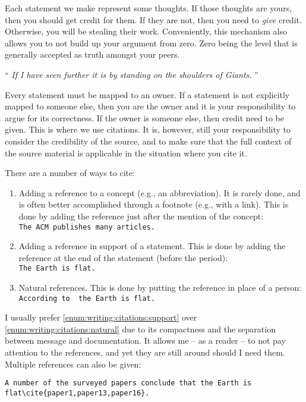 \documentclass[a4paper, oneside]{memoir}
\newenvironment{inspiration}[1]
{
    \begin{center}
    \newcommand{\saveme}{#1}
    \begin{minipage}{0.9\textwidth}
}
{
    
    \raggedleft{--- \textsl{\saveme}}
    \end{minipage}
    \end{center}
}
\newcommand{\idx}[1]{\index{#1}\marginpar{\raggedright \tiny #1}}
\begin{document}
Each statement we make represent some thoughts. If those thoughts are yours, then you should get credit\idx{Credit} for them. If they are not, then you need to \textsl{give} credit. Otherwise, you will be stealing their work. Conveniently, this mechanism also allows you to not build up your argument from zero. Zero being the level that is generally accepted as truth amongst your peers.

\begin{inspiration}{Isaac Newton\cite{Solr-dc-9792}}
  ``
    \textsl{If I have seen further it is by standing on the shoulders of Giants.}
  ''
\end{inspiration}

Every statement must be mapped to an owner. If a statement is not explicitly mapped to someone else, then you are the owner and it is your responsibility to argue for its correctness. If the owner is someone else, then credit need to be given. This is where we use citations. It is, however, still your responsibility to consider the credibility of the source, and to make sure that the full context of the source material is applicable in the situation where you cite it.

There are a number of ways to cite:
\begin{enumerate}
  \item Adding a reference to a concept (e.g., an abbreviation). It is rarely done, and is often better accomplished through a footnote (e.g., with a link). This is done by adding the reference just after the mention of the concept:
    \\
    \texttt{The ACM\cite{acm} publishes many articles.}
  \item \label{enum:writing:citations:support} Adding a reference in support of a statement. This is done by adding the reference at the end of the statement (before the period):
    \\
    \texttt{The Earth is flat\cite{source}.}
  \item  \label{enum:writing:citations:natural} Natural references. This is done by putting the reference in place of a person:
    \\
    \texttt{According to \cite{source} the Earth is flat.}
\end{enumerate}
I usually prefer \ref{enum:writing:citations:support} over \ref{enum:writing:citations:natural} due to its compactness and the separation between message and documentation. It allows me -- as a reader -- to not pay attention to the references, and yet they are still around should I need them. Multiple references can also be given:
\begin{verbatim}
A number of the surveyed papers conclude that the Earth is
flat\cite{paper1,paper13,paper16}.
\end{verbatim}
\end{document}
